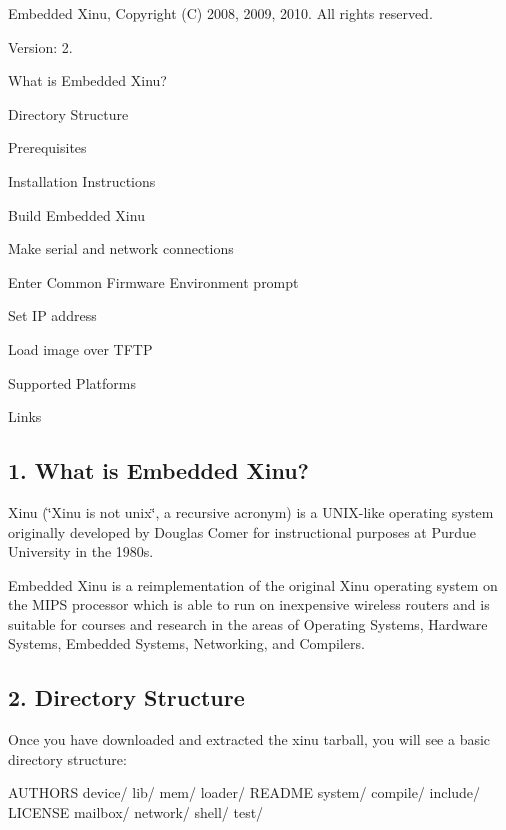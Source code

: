 Embedded Xinu, Copyright (C) 2008, 2009, 2010. All rights reserved.

Version\-: 2.


\begin{DoxyEnumerate}
\item What is Embedded Xinu?
\item Directory Structure
\item Prerequisites
\item Installation Instructions
\begin{DoxyEnumerate}
\item Build Embedded Xinu
\item Make serial and network connections
\item Enter Common Firmware Environment prompt
\item Set I\-P address
\item Load image over T\-F\-T\-P
\end{DoxyEnumerate}
\item Supported Platforms
\item Links
\end{DoxyEnumerate}

\subsection*{1. What is Embedded Xinu?}

Xinu (\char`\"{}\-Xinu is not unix\char`\"{}, a recursive acronym) is a U\-N\-I\-X-\/like operating system originally developed by Douglas Comer for instructional purposes at Purdue University in the 1980s.

Embedded Xinu is a reimplementation of the original Xinu operating system on the M\-I\-P\-S processor which is able to run on inexpensive wireless routers and is suitable for courses and research in the areas of Operating Systems, Hardware Systems, Embedded Systems, Networking, and Compilers.

\subsection*{2. Directory Structure}

Once you have downloaded and extracted the xinu tarball, you will see a basic directory structure\-: \begin{DoxyVerb}AUTHORS   device/   lib/     mem/      loader/   README  system/
compile/  include/  LICENSE  mailbox/  network/  shell/  test/
\end{DoxyVerb}



